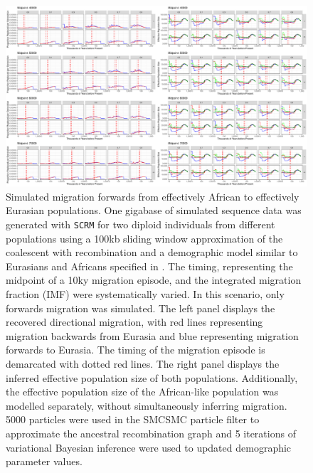\begin{figure}
	\centering
	\includegraphics[width=\textwidth]{plot/forward_different_starts.pdf}
	\caption[Simulated migration forwards from effectively African to effectively Eurasian populations]{Simulated migration forwards from effectively African to effectively Eurasian populations. One gigabase of simulated sequence data was generated with {\tt SCRM} for two diploid individuals from different populations using a 100kb sliding window approximation of the coalescent with recombination and a demographic model similar to Eurasians and Africans specified in . The timing, representing the midpoint of a 10ky migration episode, and the integrated migration fraction (IMF) were systematically varied. In this scenario, only forwards migration was simulated. The left panel displays the recovered directional migration, with red lines representing migration backwards from Eurasia and blue representing migration forwards to Eurasia. The timing of the migration episode is demarcated with dotted red lines. The right panel displays the inferred effective population size of both populations. Additionally, the effective population size of the African-like population was modelled separately, without simultaneously inferring migration. 5000 particles were used in the SMCSMC particle filter to approximate the ancestral recombination graph and 5 iterations of variational Bayesian inference were used to updated demographic parameter values.}
	\label{fig:fwdsim}
\end{figure}


